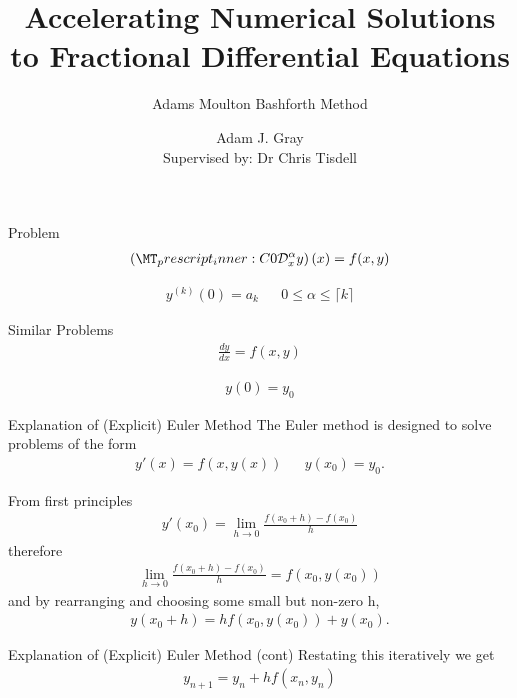 \documentclass[pdf]{beamer}
\title{Accelerating Numerical Solutions to Fractional Differential Equations}
\subtitle{Adams Moulton Bashforth Method}
\author[Adam J. Gray]{Adam J. Gray\\{\small Supervised by: Dr Chris Tisdell}}
\institute{
	School of Mathematics and Statistics \\
	University of New South Wales
}
\newcommand{\capder}[4]{ \left( \prescript{C}{#1}{\mathcal{D}_{#2}^{#3}} #4 \right) }
\newcommand{\lra}{\longrightarrow}
\begin{document}
\begin{frame}
	\titlepage
\end{frame}


\begin{frame}{Problem}
    \begin{align*}
        \capder{0}{x}{\alpha}{y}(x) = f(x,y)
    \end{align*}
    
    \begin{align*}
        y^{(k)}(0) = a_{k} & & 0 \leq \alpha \leq \lceil k \rceil
    \end{align*}
\end{frame}

\begin{frame}{Similar Problems}
    \begin{align*}
        \frac{dy}{dx} = f(x,y)
    \end{align*}
    
    \begin{align*}
        y(0) = y_0
    \end{align*}
\end{frame}

\begin{frame}{Explanation of (Explicit) Euler Method}
    The Euler method is designed to solve problems of the form
    \begin{align*}
        y'(x) = f(x,y(x)) & & y(x_0) = y_0.
    \end{align*}
    
    From first principles
    \begin{align*}
        y'(x_0) = \lim_{h \lra 0}\frac{f(x_0 + h) - f(x_0)}{h}
    \end{align*}
    therefore
    \begin{align*}
        \lim_{h \lra 0}\frac{f(x_0 + h) - f(x_0)}{h} = f(x_0, y(x_0))
    \end{align*}
    and by rearranging and choosing some small but non-zero h,
    \begin{align*}
        y(x_0 + h) = hf(x_0, y(x_0)) + y(x_0).
    \end{align*}
\end{frame}

\begin{frame}{Explanation of (Explicit) Euler Method (cont)}
    Restating this iteratively we get
    \begin{align*}
        y_{n+1} = y_{n} + hf(x_n,y_n)
    \end{align*}
\end{frame}
\end{document}
